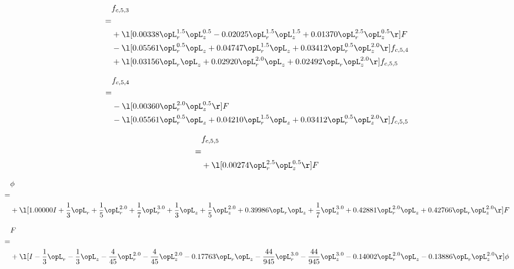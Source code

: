 \begin{alignat}{2} 
\label{eq:f_53_2} 
& f_{c,5,3} \nonumber \\ 
 = \\ 
& + \l[  0.00338 \opL_r^{1.5} \opL_z^{0.5}   -0.02025 \opL_r^{1.5} \opL_z^{1.5} +  0.01370 \opL_r^{2.5} \opL_z^{0.5}  \r] F \nonumber \\ 
& - \l[  0.05561 \opL_r^{0.5} \opL_z +  0.04747 \opL_r^{1.5} \opL_z +  0.03412 \opL_r^{0.5} \opL_z^{2.0}  \r] f_{c,5,4} \nonumber \\ 
& + \l[  0.03156 \opL_r \opL_z +  0.02920 \opL_r^{2.0} \opL_z +  0.02492 \opL_r \opL_z^{2.0}  \r] f_{c,5,5} \nonumber \\ 
\end{alignat} 


\begin{alignat}{2} 
\label{eq:f_54_2} 
& f_{c,5,4} \nonumber \\ 
 = \\ 
& - \l[  0.00360 \opL_r^{2.0} \opL_z^{0.5}  \r] F \nonumber \\ 
& - \l[  0.05561 \opL_r^{0.5} \opL_z +  0.04210 \opL_r^{1.5} \opL_z +  0.03412 \opL_r^{0.5} \opL_z^{2.0}  \r] f_{c,5,5} \nonumber \\ 
\end{alignat} 


\begin{alignat}{2} 
\label{eq:f_55_2} 
& f_{c,5,5} \nonumber \\ 
 = \\ 
& + \l[  0.00274 \opL_r^{2.5} \opL_z^{0.5}  \r] F \nonumber \\ 
\end{alignat} 


\begin{alignat}{2} 
\label{eq:scalarFlux_1} 
& \phi \nonumber \\ 
 = \\ 
& + \l[  1.00000 I + \frac{1}{3} \opL_r + \frac{1}{5} \opL_r^{2.0} + \frac{1}{7} \opL_r^{3.0} + \frac{1}{3} \opL_z + \frac{1}{5} \opL_z^{2.0} +  0.39986 \opL_r \opL_z + \frac{1}{7} \opL_z^{3.0} +  0.42881 \opL_r^{2.0} \opL_z +  0.42766 \opL_r \opL_z^{2.0}  \r] F \nonumber \\ 
\end{alignat} 


\begin{alignat}{2} 
\label{eq:transport3D_0} 
& F \nonumber \\ 
 = \\ 
& + \l[ I - \frac{1}{3} \opL_r - \frac{1}{3} \opL_z - \frac{4}{45} \opL_r^{2.0} - \frac{4}{45} \opL_z^{2.0}   -0.17763 \opL_r \opL_z - \frac{44}{945} \opL_r^{3.0} - \frac{44}{945} \opL_z^{3.0}   -0.14002 \opL_r^{2.0} \opL_z   -0.13886 \opL_r \opL_z^{2.0}  \r] \phi \nonumber \\ 
\end{alignat} 


